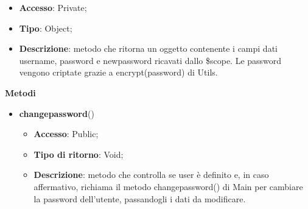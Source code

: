 {{\begin{itemize}
			\begin{itemize}
				\item \textbf{Accesso}: Private;
				\item \textbf{Tipo}: Object;
				\item \textbf{Descrizione}: metodo che ritorna un oggetto contenente i campi dati username, password e newpassword ricavati dallo \$scope. Le password vengono criptate grazie a encrypt(password) di Utils.
			\end{itemize}
	    \end{itemize}
		\textbf{Metodi}
		\begin{itemize}
			\item \textbf{changepassword}()
			\begin{itemize}
				\item \textbf{Accesso}: Public;
				\item \textbf{Tipo di ritorno}: Void;
				\item \textbf{Descrizione}: metodo che controlla se user è definito e, in caso affermativo, richiama il metodo changepassword() di Main per cambiare la password dell'utente, passandogli i dati da modificare.
			\end{itemize}
		\end{itemize}
	}
}
